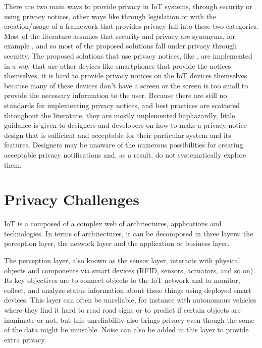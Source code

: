 \documentclass[conference]{IEEEtran}
\begin{document}
There are two main ways to provide privacy in IoT systems, through security
or using privacy notices, other ways like through legislation or with the
creation/usage of a framework that provides privacy fall into these two
categories. Most of the literature assumes that security and privacy are
synonyms, for example \cite{opara2022framework, FabianoInternet, SunSecure},
and so most of the proposed solutions fall under privacy through security.
The proposed solutions that use privacy notices, like \cite{FengDesign}, are
implemented in a way that use other devices like smartphones that provide the
notices themselves, it is hard to provide privacy notices on the IoT devices
themselves because many of these devices don't have a screen or the screen is
too small to provide the necessary information to the user. Because there are
still no standards for implementing privacy notices, and best practices are
scattered throughout the literature, they are mostly implemented haphazardly,
little guidance is given to designers and developers on how to make a privacy
notice design that is sufficient and acceptable for their particular system and
its features. Designers may be unaware of the numerous possibilities for creating
acceptable privacy notifications and, as a result, do not systematically explore
them.

\section{Privacy Challenges}

IoT is a composed of a complex web of architectures, applications and
technologies. In terms of architectures, it can be decomposed in three
layers: the perception layer, the network layer and the application or
business layer.

The perception layer, also known as the sensor layer, interacts with physical
objects and components via smart devices (RFID, sensors, actuators, and so on).
Its key objectives are to connect objects to the IoT network and to monitor,
collect, and analyze status information about these things using deployed
smart devices. This layer can often be unreliable, for instance with autonomous
vehicles where they find it hard to read road signs or to predict if certain
objects are inanimate or not, but this unreliability also brings privacy
even though the some of the data might be unusable. Noise can also be added
in this layer to provide extra privacy.
\end{document}

